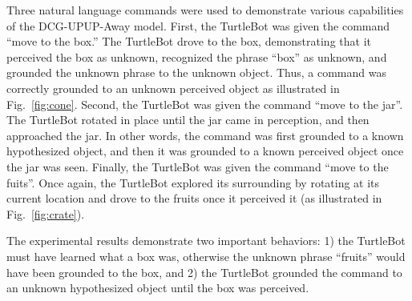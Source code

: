 Three natural language commands were used to demonstrate various capabilities of the DCG-UPUP-Away model.
First, the TurtleBot was given the command ``move to the box.''
The TurtleBot drove to the box, demonstrating that it perceived the box as unknown, recognized the phrase ``box'' as unknown, and grounded the unknown phrase to the unknown object.
Thus, a command was correctly grounded to an unknown perceived object as illustrated in Fig.~\ref{fig:cone}.
Second, the TurtleBot was given the command ``move to the jar''.
The TurtleBot rotated in place until the jar came in perception, and then approached the jar.
In other words, the command was first grounded to a known hypothesized object, and then it was grounded to a known perceived object once the jar was seen. 
Finally, the TurtleBot was given the command ``move to the fuits''.
Once again, the TurtleBot explored its surrounding by rotating at its current location and drove to the fruits once it perceived it (as illustrated in Fig.~\ref{fig:crate}). %

The experimental results demonstrate two important behaviors: 1) the TurtleBot must have learned what a box was, otherwise the unknown phrase ``fruits'' would have been grounded to the box, and 2) the TurtleBot grounded the command to an unknown hypothesized object until the box was perceived. %

